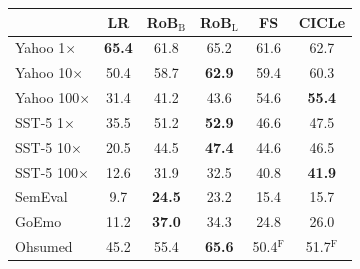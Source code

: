 \begin{tabular}{lccccc}
\toprule
 & LR & RoB$_{\mathrm{B}}$ & RoB$_{\mathrm{L}}$ & FS & CICLe \\
\midrule
Yahoo 1$\times$ & \textbf{65.4} & 61.8 & 65.2 & 61.6 & 62.7 \\
Yahoo 10$\times$ & 50.4 & 58.7 & \textbf{62.9} & 59.4 & 60.3 \\
Yahoo 100$\times$ & 31.4 & 41.2 & 43.6 & 54.6 & \textbf{55.4} \\
\midrule
SST-5 1$\times$ & 35.5 & 51.2 & \textbf{52.9} & 46.6 & 47.5 \\
SST-5 10$\times$ & 20.5 & 44.5 & \textbf{47.4} & 44.6 & 46.5 \\
SST-5 100$\times$ & 12.6 & 31.9 & 32.5 & 40.8 & \textbf{41.9} \\
\midrule
SemEval & 9.7 & \textbf{24.5} & 23.2 & 15.4 & 15.7 \\
GoEmo & 11.2 & \textbf{37.0} & 34.3 & 24.8 & 26.0 \\
Ohsumed & 45.2 & 55.4 & \textbf{65.6} & 50.4$^{\mathrm{F}}$ & 51.7$^{\mathrm{F}}$ \\
\bottomrule
\end{tabular}
